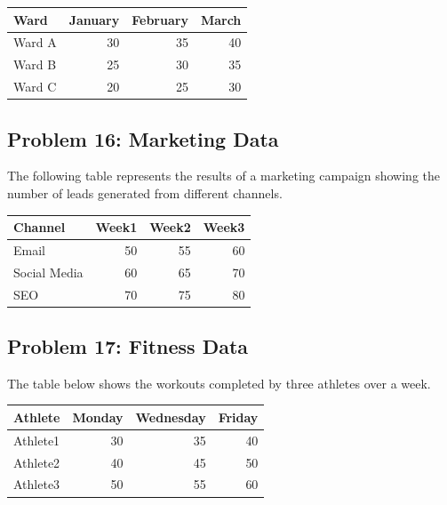 \documentclass[
  letterpaper,
  DIV=11,
  numbers=noendperiod]{scrreprt}
\begin{document}
\begin{table}
\centering
\begin{tabular}{l|r|r|r}
\hline
Ward & January & February & March\\
\hline
Ward A & 30 & 35 & 40\\
\hline
Ward B & 25 & 30 & 35\\
\hline
Ward C & 20 & 25 & 30\\
\hline
\end{tabular}
\end{table}

\subsection*{Problem 16: Marketing
Data}\label{problem-16-marketing-data}

The following table represents the results of a marketing campaign
showing the number of leads generated from different channels.

\begin{table}
\centering
\begin{tabular}{l|r|r|r}
\hline
Channel & Week1 & Week2 & Week3\\
\hline
Email & 50 & 55 & 60\\
\hline
Social Media & 60 & 65 & 70\\
\hline
SEO & 70 & 75 & 80\\
\hline
\end{tabular}
\end{table}

\subsection*{Problem 17: Fitness Data}\label{problem-17-fitness-data}

The table below shows the workouts completed by three athletes over a
week.

\begin{table}
\centering
\begin{tabular}{l|r|r|r}
\hline
Athlete & Monday & Wednesday & Friday\\
\hline
Athlete1 & 30 & 35 & 40\\
\hline
Athlete2 & 40 & 45 & 50\\
\hline
Athlete3 & 50 & 55 & 60\\
\hline
\end{tabular}
\end{table}
\end{document}
